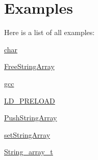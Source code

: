 \section{Examples}
Here is a list of all examples\+:\begin{DoxyCompactItemize}
\item 
\hyperlink{char-example}{char}
\item 
\hyperlink{FreeStringArray-example}{Free\+String\+Array}
\item 
\hyperlink{gcc-example}{gcc}
\item 
\hyperlink{LD_PRELOAD-example}{L\+D\+\_\+\+P\+R\+E\+L\+O\+AD}
\item 
\hyperlink{PushStringArray-example}{Push\+String\+Array}
\item 
\hyperlink{setStringArray-example}{set\+String\+Array}
\item 
\hyperlink{String_array_t-example}{String\+\_\+array\+\_\+t}
\end{DoxyCompactItemize}
